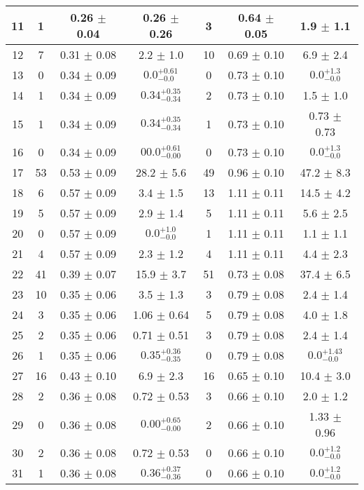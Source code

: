 \begin{table}[h!]
\begin{tabular}{c|c|c|c|c|c|c}
11 & 1  & 0.26  $\pm$  0.04  & 0.26 $\pm$ 0.26 & 3  & 0.64  $\pm$  0.05  & 1.9 $\pm$ 1.1     \\\hline
12 & 7  & 0.31  $\pm$  0.08  & 2.2 $\pm$ 1.0 & 10  & 0.69  $\pm$  0.10  & 6.9 $\pm$ 2.4     \\\hline
13 & 0  & 0.34  $\pm$  0.09  & $0.0 _{-0.0}^{+0.61}$ & 0  & 0.73  $\pm$  0.10  & $0.0 _{-0.0}^{+1.3}$     \\\hline
14 & 1  & 0.34  $\pm$  0.09  & $0.34^{+0.35}_{-0.34}$ & 2  & 0.73  $\pm$  0.10  & 1.5 $\pm$ 1.0     \\\hline
15 & 1  & 0.34  $\pm$  0.09  & $0.34^{+0.35}_{-0.34}$ & 1  & 0.73  $\pm$  0.10  & 0.73 $\pm$ 0.73     \\\hline
16 & 0  & 0.34  $\pm$  0.09  & $00.0 _{-0.00}^{+0.61}$ & 0  & 0.73  $\pm$  0.10  & $0.0 _{-0.0}^{+1.3}$     \\\hline
17 & 53  & 0.53  $\pm$  0.09  & 28.2 $\pm$ 5.6 & 49  & 0.96  $\pm$  0.10  & 47.2 $\pm$ 8.3     \\\hline
18 & 6  & 0.57  $\pm$  0.09  & 3.4 $\pm$ 1.5 & 13  & 1.11  $\pm$  0.11  & 14.5 $\pm$ 4.2     \\\hline
19 & 5  & 0.57  $\pm$  0.09  & 2.9 $\pm$ 1.4 & 5  & 1.11  $\pm$  0.11  & 5.6 $\pm$ 2.5     \\\hline
20 & 0  & 0.57  $\pm$  0.09  & $0.0 _{-0.0}^{+1.0}$ & 1  & 1.11  $\pm$  0.11  & 1.1 $\pm$ 1.1     \\\hline
21 & 4  & 0.57  $\pm$  0.09  & 2.3 $\pm$ 1.2 & 4  & 1.11  $\pm$  0.11  & 4.4 $\pm$ 2.3     \\\hline
22 & 41  & 0.39  $\pm$  0.07  & 15.9 $\pm$ 3.7 & 51  & 0.73  $\pm$  0.08  & 37.4 $\pm$ 6.5     \\\hline
23 & 10  & 0.35  $\pm$  0.06  & 3.5 $\pm$ 1.3 & 3  & 0.79  $\pm$  0.08  & 2.4 $\pm$ 1.4     \\\hline
24 & 3  & 0.35  $\pm$  0.06  & 1.06 $\pm$ 0.64 & 5  & 0.79  $\pm$  0.08  & 4.0 $\pm$ 1.8     \\\hline
25 & 2  & 0.35  $\pm$  0.06  & 0.71 $\pm$ 0.51 & 3  & 0.79  $\pm$  0.08  & 2.4 $\pm$ 1.4     \\\hline
26 & 1  & 0.35  $\pm$  0.06  & $0.35^{+0.36}_{-0.35}$ & 0  & 0.79  $\pm$  0.08  & $0.0 _{-0.0}^{+1.43}$     \\\hline
27 & 16  & 0.43  $\pm$  0.10  & 6.9 $\pm$ 2.3 & 16  & 0.65  $\pm$  0.10  & 10.4 $\pm$ 3.0     \\\hline
28 & 2  & 0.36  $\pm$  0.08  & 0.72 $\pm$ 0.53 & 3  & 0.66  $\pm$  0.10  & 2.0 $\pm$ 1.2     \\\hline
29 & 0  & 0.36  $\pm$  0.08  & $0.00 _{-0.00}^{+0.65}$ & 2  & 0.66  $\pm$  0.10  & 1.33 $\pm$ 0.96     \\\hline
30 & 2  & 0.36  $\pm$  0.08  & 0.72 $\pm$ 0.53 & 0  & 0.66  $\pm$  0.10  & $0.0_{-0.0}^{+1.2}$     \\\hline
31 & 1  & 0.36  $\pm$  0.08  & $0.36^{+0.37}_{-0.36}$ & 0  & 0.66  $\pm$  0.10  & $0.0_{-0.0}^{+1.2}$     \\\hline
\end{tabular}
\end{table}


